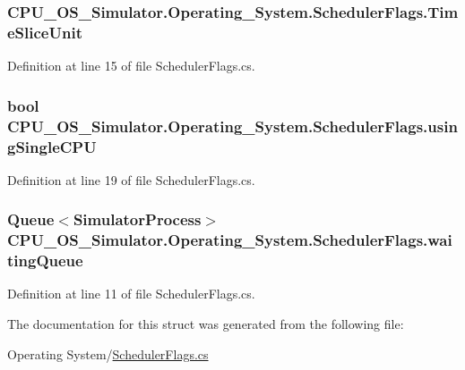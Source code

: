 \subsubsection[{Time\+Slice\+Unit}]{ C\+P\+U\+\_\+\+O\+S\+\_\+\+Simulator.\+Operating\+\_\+\+System.\+Scheduler\+Flags.\+Time\+Slice\+Unit}\label{struct_c_p_u___o_s___simulator_1_1_operating___system_1_1_scheduler_flags_af668afafedff1a596fff642d2fcd38b7}


Definition at line 15 of file Scheduler\+Flags.\+cs.

\hypertarget{struct_c_p_u___o_s___simulator_1_1_operating___system_1_1_scheduler_flags_a7b42d8ef49035b7d450032a1e4060fb6}{}
\subsubsection[{using\+Single\+C\+P\+U}]{\setlength{\rightskip}{0pt plus 5cm}bool C\+P\+U\+\_\+\+O\+S\+\_\+\+Simulator.\+Operating\+\_\+\+System.\+Scheduler\+Flags.\+using\+Single\+C\+P\+U}\label{struct_c_p_u___o_s___simulator_1_1_operating___system_1_1_scheduler_flags_a7b42d8ef49035b7d450032a1e4060fb6}


Definition at line 19 of file Scheduler\+Flags.\+cs.

\hypertarget{struct_c_p_u___o_s___simulator_1_1_operating___system_1_1_scheduler_flags_acd01af6379302599c522a0331a6276fc}{}
\subsubsection[{waiting\+Queue}]{\setlength{\rightskip}{0pt plus 5cm}Queue$<${\bf Simulator\+Process}$>$ C\+P\+U\+\_\+\+O\+S\+\_\+\+Simulator.\+Operating\+\_\+\+System.\+Scheduler\+Flags.\+waiting\+Queue}\label{struct_c_p_u___o_s___simulator_1_1_operating___system_1_1_scheduler_flags_acd01af6379302599c522a0331a6276fc}


Definition at line 11 of file Scheduler\+Flags.\+cs.



The documentation for this struct was generated from the following file\+:\begin{DoxyCompactItemize}
\item 
Operating System/\hyperlink{_scheduler_flags_8cs}{Scheduler\+Flags.\+cs}\end{DoxyCompactItemize}
